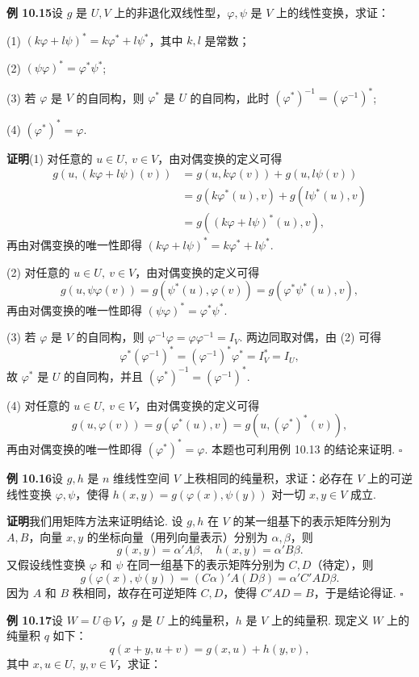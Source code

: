 \documentclass[UTF8, 12pt, fontset=fandol, oneside]{ctexart}
\begin{document}
\noindent\textbf{例 10.15}\quad 设 $g$ 是 $U,V$ 上的非退化双线性型，$\varphi,\psi$ 是 $V$ 上的线性变换，求证：

(1) $(k\varphi+l\psi)^*=k\varphi^*+l\psi^*$，其中 $k,l$ 是常数；

(2) $(\psi\varphi)^*=\varphi^*\psi^*$;

(3) 若 $\varphi$ 是 $V$ 的自同构，则 $\varphi^*$ 是 $U$ 的自同构，此时 $(\varphi^*)^{-1}=(\varphi^{-1})^*$;

(4) $(\varphi^*)^*=\varphi$.

\noindent\textbf{证明}\quad (1) 对任意的 $u\in U,\ v\in V$，由对偶变换的定义可得
\[
\begin{aligned}
g(u,(k\varphi+l\psi)(v))
&=g(u,k\varphi(v))+g(u,l\psi(v))\\
&=g(k\varphi^*(u),v)+g(l\psi^*(u),v)\\
&=g((k\varphi+l\psi)^*(u),v),
\end{aligned}
\]
再由对偶变换的唯一性即得 $(k\varphi+l\psi)^*=k\varphi^*+l\psi^*$.

(2) 对任意的 $u\in U,\ v\in V$，由对偶变换的定义可得
\[
g(u,\psi\varphi(v))=g(\psi^*(u),\varphi(v))=g(\varphi^*\psi^*(u),v),
\]
再由对偶变换的唯一性即得 $(\psi\varphi)^*=\varphi^*\psi^*$.

(3) 若 $\varphi$ 是 $V$ 的自同构，则 $\varphi^{-1}\varphi=\varphi\varphi^{-1}=I_V$. 两边同取对偶，由 (2) 可得
\[
\varphi^*(\varphi^{-1})^*=(\varphi^{-1})^*\varphi^*=I_V^*=I_U,
\]
故 $\varphi^*$ 是 $U$ 的自同构，并且 $(\varphi^*)^{-1}=(\varphi^{-1})^*$.

(4) 对任意的 $u\in U,\ v\in V$，由对偶变换的定义可得
\[
g(u,\varphi(v))=g(\varphi^*(u),v)=g(u,(\varphi^*)^*(v)),
\]
再由对偶变换的唯一性即得 $(\varphi^*)^*=\varphi$. 本题也可利用例 10.13 的结论来证明. $\square$

\noindent\textbf{例 10.16}\quad 设 $g,h$ 是 $n$ 维线性空间 $V$ 上秩相同的纯量积，求证：必存在 $V$ 上的可逆线性变换 $\varphi,\psi$，使得 $h(x,y)=g(\varphi(x),\psi(y))$ 对一切 $x,y\in V$ 成立.

\noindent\textbf{证明}\quad 我们用矩阵方法来证明结论. 设 $g,h$ 在 $V$ 的某一组基下的表示矩阵分别为 $A,B$，向量 $x,y$ 的坐标向量（用列向量表示）分别为 $\alpha,\beta$，则
\[
g(x,y)=\alpha'A\beta,\quad h(x,y)=\alpha'B\beta.
\]
又假设线性变换 $\varphi$ 和 $\psi$ 在同一组基下的表示矩阵分别为 $C,D$（待定），则
\[
g(\varphi(x),\psi(y))=(C\alpha)'A(D\beta)=\alpha'C'AD\beta.
\]
因为 $A$ 和 $B$ 秩相同，故存在可逆矩阵 $C,D$，使得 $C'AD=B$，于是结论得证. $\square$

\noindent\textbf{例 10.17}\quad 设 $W=U\oplus V$，$g$ 是 $U$ 上的纯量积，$h$ 是 $V$ 上的纯量积. 现定义 $W$ 上的纯量积 $q$ 如下：
\[
q(x+y,u+v)=g(x,u)+h(y,v),
\]
其中 $x,u\in U,\ y,v\in V$，求证：
\end{document}
